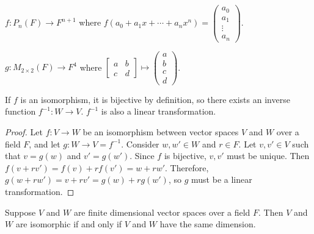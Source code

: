 \documentclass[12pt]{article}
\begin{document}
\begin{exmp}
    $f: P_n(F) \to F^{n+1}$ where $f(a_0 + a_1x + \cdots + a_nx^n) = \begin{pmatrix}
        a_0 \\ a_1 \\ \vdots \\ a_n
    \end{pmatrix}$.
\end{exmp}

\begin{exmp}
    $g: M_{2\times2}(F) \to F^4$ where $\begin{bmatrix}
        a & b \\ c & d
    \end{bmatrix} \mapsto \begin{pmatrix}
        a \\ b \\ c \\ d
    \end{pmatrix}$.
\end{exmp}

\begin{prop}
    If $f$ is an isomorphism, it is bijective by definition, so there exists an inverse function $f^{-1}: W \to V$. $f^{-1}$ is also a linear transformation.
\end{prop}

\begin{proof}
    Let $f: V \to W$ be an isomorphism between vector spaces $V$ and $W$ over a field $F$, and let $g: W \to V = f^{-1}$. Consider $w, w' \in W$ and $r \in F$. Let $v, v' \in V$ such that $v = g(w)$ and $v' = g(w')$. Since $f$ is bijective, $v, v'$ must be unique. Then $f(v + rv') = f(v) + rf(v') = w + rw'$. Therefore, $g(w + rw') = v + rv' = g(w) + rg(w')$, so $g$ must be a linear transformation.
\end{proof}

\begin{thm}
    Suppose $V$ and $W$ are finite dimensional vector spaces over a field $F$. Then $V$ and $W$ are isomorphic if and only if $V$ and $W$ have the same dimension.
\end{thm}
\end{document}
